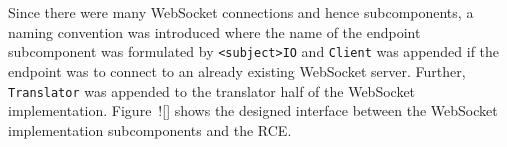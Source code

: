         
      
      \\\\
        Since there were many WebSocket connections and hence subcomponents, a naming convention was introduced where the name of the endpoint subcomponent was formulated by \texttt{<subject>IO} and \texttt{Client} was appended if the endpoint was to connect to an already existing WebSocket server. Further, \texttt{Translator} was appended to the translator half of the WebSocket implementation. Figure~![] shows the designed interface between the WebSocket implementation subcomponents and the RCE.
      